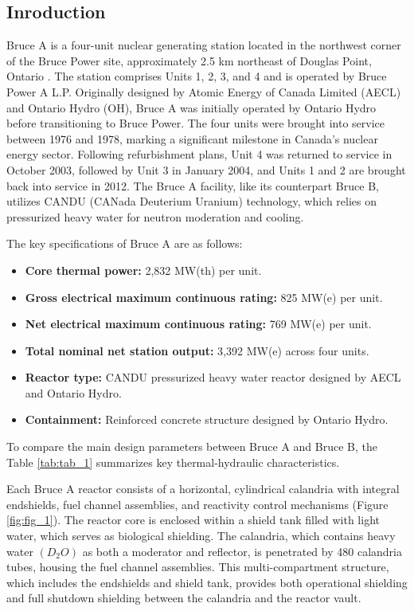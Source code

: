 \documentclass[12pt]{article}
\begin{document}
\begin{multicols}{2}

\section{Inroduction}

Bruce A is a four-unit nuclear generating station located in the northwest corner of the Bruce Power site, approximately 2.5 km northeast of Douglas Point, Ontario \cite{BruceSafetyReport2006}. The station comprises Units 1, 2, 3, and 4 and is operated by Bruce Power A L.P. Originally designed by Atomic Energy of Canada Limited (AECL) and Ontario Hydro (OH), Bruce A was initially operated by Ontario Hydro before transitioning to Bruce Power. The four units were brought into service between 1976 and 1978, marking a significant milestone in Canada’s nuclear energy sector. Following refurbishment plans, Unit 4 was returned to service in October 2003, followed by Unit 3 in January 2004, and Units 1 and 2 are brought back into service in 2012. The Bruce A facility, like its counterpart Bruce B, utilizes CANDU (CANada Deuterium Uranium) technology, which relies on pressurized heavy water for neutron moderation and cooling.

The key specifications of Bruce A are as follows:

\begin{itemize}
    \item \textbf{Core thermal power:} 2,832 MW(th) per unit.
    \item \textbf{Gross electrical maximum continuous rating:} 825 MW(e) per unit.
    \item \textbf{Net electrical maximum continuous rating:} 769 MW(e) per unit.
    \item \textbf{Total nominal net station output:} 3,392 MW(e) across four units.
    \item \textbf{Reactor type:} CANDU pressurized heavy water reactor designed by AECL and Ontario Hydro.
    \item \textbf{Containment:}  Reinforced concrete structure designed by Ontario Hydro.

\end{itemize}

To compare the main design parameters between Bruce A and Bruce B, the Table \ref{tab:tab_1} summarizes key thermal-hydraulic characteristics.

Each Bruce A reactor consists of a horizontal, cylindrical calandria with integral endshields, fuel channel assemblies, and reactivity control mechanisms (Figure \ref{fig:fig_1}). The reactor core is enclosed within a shield tank filled with light water, which serves as biological shielding. The calandria, which contains heavy water $(D_{2}O)$ as both a moderator and reflector, is penetrated by 480 calandria tubes, housing the fuel channel assemblies. This multi-compartment structure, which includes the endshields and shield tank, provides both operational shielding and full shutdown shielding between the calandria and the reactor vault.


\end{multicols}
\end{document}
